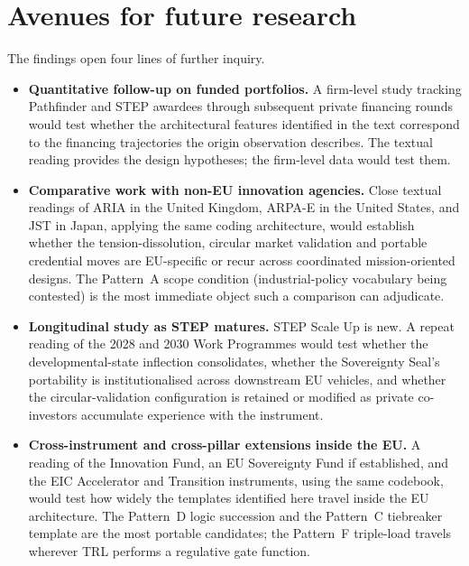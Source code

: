 \section{Avenues for future research}
\label{sec:conc-future}

The findings open four lines of further inquiry.
\begin{itemize}[leftmargin=*]
    \item \textbf{Quantitative follow-up on funded portfolios.} A
          firm-level study tracking Pathfinder and STEP awardees through
          subsequent private financing rounds would test whether the
          architectural features identified in the text correspond to
          the financing trajectories the origin observation describes.
          The textual reading provides the design hypotheses; the
          firm-level data would test them.
    \item \textbf{Comparative work with non-EU innovation agencies.}
          Close textual readings of ARIA in the United Kingdom, ARPA-E
          in the United States, and JST in Japan, applying the same
          coding architecture, would establish whether the
          tension-dissolution, circular market validation and portable
          credential moves are EU-specific or recur across coordinated
          mission-oriented designs. The Pattern~A scope condition
          (industrial-policy vocabulary being contested) is the most
          immediate object such a comparison can adjudicate.
    \item \textbf{Longitudinal study as STEP matures.} STEP Scale Up is
          new. A repeat reading of the 2028 and 2030 Work Programmes
          would test whether the developmental-state inflection
          consolidates, whether the Sovereignty Seal's portability is
          institutionalised across downstream EU vehicles, and whether
          the circular-validation configuration is retained or modified
          as private co-investors accumulate experience with the
          instrument.
    \item \textbf{Cross-instrument and cross-pillar extensions inside
          the EU.} A reading of the Innovation Fund, an EU Sovereignty
          Fund if established, and the EIC Accelerator and Transition
          instruments, using the same codebook, would test how widely
          the templates identified here travel inside the EU
          architecture. The Pattern~D logic succession and the
          Pattern~C tiebreaker template are the most portable
          candidates; the Pattern~F triple-load travels wherever TRL
          performs a regulative gate function.
\end{itemize}

